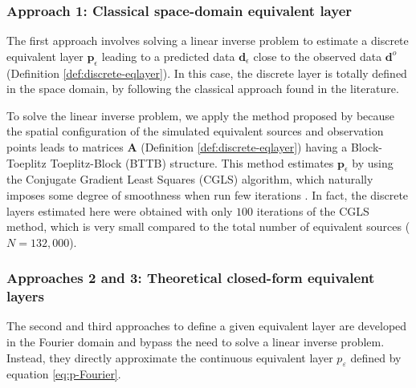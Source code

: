 \documentclass[manuscript,noblind]{geophysics}
\begin{document}
	\subsubsection{Approach 1: Classical space-domain equivalent layer}
	
	The first approach involves solving a linear inverse problem to estimate a discrete 
	equivalent layer $\mathbf{p}_{\epsilon}$ leading to a predicted data $\mathbf{d}_{\epsilon}$ 
	close to the observed data $\mathbf{d}^{o}$ (Definition \ref{def:discrete-eqlayer}).
	In this case, the discrete layer is totally defined in the space domain, by following the 
	classical approach found in the literature.
	
	To solve the linear inverse problem, we apply the method proposed by 
	\citet{takahashi-etal2020, takahashi-etal2022} because the spatial configuration of the 
	simulated equivalent sources and observation points leads to 
	matrices $\mathbf{A}$ (Definition \ref{def:discrete-eqlayer}) having a Block-Toeplitz 
	Toeplitz-Block (BTTB) structure.
	This method estimates $\mathbf{p}_{\epsilon}$ by using the Conjugate Gradient Least Squares 
	(CGLS) algorithm, which naturally imposes some degree of smoothness when run few iterations 
	\citep[][ p. 166]{aster_etal2019}.
	In fact, the discrete layers estimated here were obtained with only $100$ iterations of the 
	CGLS method, which is very small compared to the total number of equivalent sources 
	($N = 132,000$).
	
	\subsubsection{Approaches 2 and 3: Theoretical closed-form equivalent layers}
	
	The second and third approaches to define a given equivalent layer are developed in the Fourier domain 
	and bypass the need to solve a linear inverse problem. Instead, they directly approximate the continuous 
	equivalent layer $p_{\varepsilon}$ defined by equation \ref{eq:p-Fourier}. 
	
\end{document}
